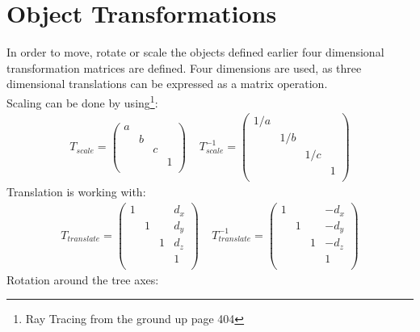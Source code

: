 \section{Object Transformations}
In order to move, rotate or scale the objects defined earlier four dimensional transformation matrices are defined. Four dimensions are used, as three dimensional translations can be expressed as a matrix operation. \\ 
Scaling can be done by using\footnote{Ray Tracing from the ground up page 404}:
\begin{align}
T_{scale} = \begin{pmatrix}
a &   &   &\\
  & b &   &\\
  &   & c &\\
  &   &   & 1 \\
\end{pmatrix}
\;\;\;\; T_{scale}^{-1} = 
\begin{pmatrix}
1/a &   & & \\
  & 1/b & & \\
  &   & 1/c & \\
  &   &     & 1 \\
\end{pmatrix}
\end{align}
Translation is working with:
\begin{align}
T_{translate} = \begin{pmatrix}
1 &   &  & d_x\\
  & 1 &  & d_y\\
  &   & 1 & d_z \\
  &   &   & 1 \\
\end{pmatrix}
\;\;\;\; T_{translate}^{-1} = 
\begin{pmatrix}
1 &   &  & -d_x\\
  & 1 &  & -d_y\\
  &   & 1 & -d_z \\
  &   &   & 1 \\\end{pmatrix}
\end{align}
Rotation around the tree axes:
